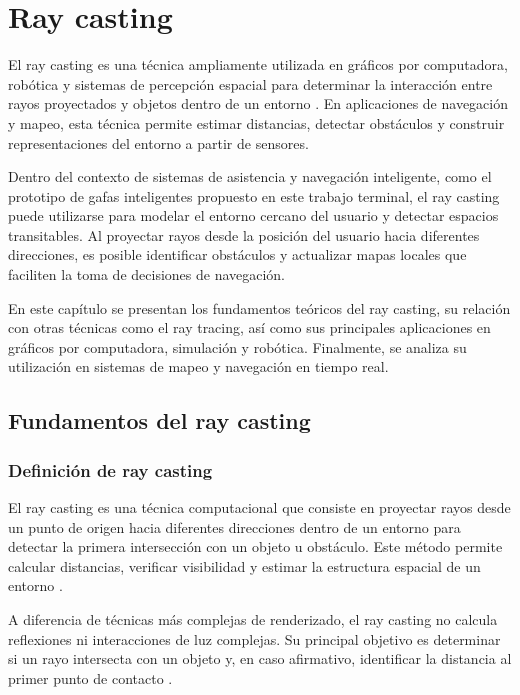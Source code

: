 \section{Ray casting}

El ray casting es una técnica ampliamente utilizada en gráficos por computadora, robótica y sistemas de percepción espacial para determinar la interacción entre rayos proyectados y objetos dentro de un entorno \cite{stackoverflow_raycasting}. En aplicaciones de navegación y mapeo, esta técnica permite estimar distancias, detectar obstáculos y construir representaciones del entorno a partir de sensores.

Dentro del contexto de sistemas de asistencia y navegación inteligente, como el prototipo de gafas inteligentes propuesto en este trabajo terminal, el ray casting puede utilizarse para modelar el entorno cercano del usuario y detectar espacios transitables. Al proyectar rayos desde la posición del usuario hacia diferentes direcciones, es posible identificar obstáculos y actualizar mapas locales que faciliten la toma de decisiones de navegación.

En este capítulo se presentan los fundamentos teóricos del ray casting, su relación con otras técnicas como el ray tracing, así como sus principales aplicaciones en gráficos por computadora, simulación y robótica. Finalmente, se analiza su utilización en sistemas de mapeo y navegación en tiempo real.

\subsection{Fundamentos del ray casting}

\subsubsection{Definición de ray casting}

El ray casting es una técnica computacional que consiste en proyectar rayos desde un punto de origen hacia diferentes direcciones dentro de un entorno para detectar la primera intersección con un objeto u obstáculo. Este método permite calcular distancias, verificar visibilidad y estimar la estructura espacial de un entorno \cite{stackoverflow_raycasting}.

A diferencia de técnicas más complejas de renderizado, el ray casting no calcula reflexiones ni interacciones de luz complejas. Su principal objetivo es determinar si un rayo intersecta con un objeto y, en caso afirmativo, identificar la distancia al primer punto de contacto \cite{stackoverflow_raycasting}.

